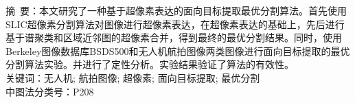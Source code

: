 
\begin{center}
\parbox{\textwidth}
{
\setlength{\baselineskip}{18pt}
{\heiti 摘~要：}{\kaishu 本文研究了一种基于超像素表达的面向目标提取最优分割算法。首先使用SLIC超像素分割算法对图像进行超像素表达，在超像素表达的基础上，先后进行基于谱聚类和区域近邻图的超像素合并，得到最终的最优分割结果。同时，使用 Berkeley图像数据库BSDS500和无人机航拍图像两类图像进行面向目标提取的最优分割算法实验。并进行了定性分析。实验结果验证了算法的有效性。}\\
{\heiti 关键词：}{\kaishu 无人机; 航拍图像; 超像素; 面向目标提取; 最优分割}\\
{\heiti 中图法分类号：P208}\qquad \qquad \qquad \qquad \qquad \qquad \qquad \qquad \qquad \qquad \qquad \qquad \qquad {}}
\end{center}